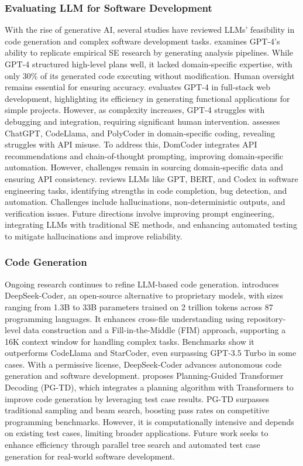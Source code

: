 \subsubsection{Evaluating LLM for Software Development}
With the rise of generative AI, several studies have reviewed LLMs' feasibility in code generation and complex software development tasks.
\citet{liang2024can} examines GPT-4’s ability to replicate empirical SE research by generating analysis pipelines. While GPT-4 structured high-level plans well, it lacked domain-specific expertise, with only 30\% of its generated code executing without modification. Human oversight remains essential for ensuring accuracy. \citet{sandberg2024evaluating} evaluates GPT-4 in full-stack web development, highlighting its efficiency in generating functional applications for simple projects. However, as complexity increases, GPT-4 struggles with debugging and integration, requiring significant human intervention. \citet{gu2023effectiveness} assesses ChatGPT, CodeLlama, and PolyCoder in domain-specific coding, revealing struggles with API misuse. To address this, DomCoder integrates API recommendations and chain-of-thought prompting, improving domain-specific automation. However, challenges remain in sourcing domain-specific data and ensuring API consistency. 
\citet{fan2023large} reviews LLMs like GPT, BERT, and Codex in software engineering tasks, identifying strengths in code completion, bug detection, and automation. Challenges include hallucinations, non-deterministic outputs, and verification issues. Future directions involve improving prompt engineering, integrating LLMs with traditional SE methods, and enhancing automated testing to mitigate hallucinations and improve reliability.

\subsubsection{Code Generation}
Ongoing research continues to refine LLM-based code generation.
\citet{guo2024deepseek} introduces DeepSeek-Coder, an open-source alternative to proprietary models, with sizes ranging from 1.3B to 33B parameters trained on 2 trillion tokens across 87 programming languages. It enhances cross-file understanding using repository-level data construction and a Fill-in-the-Middle (FIM) approach, supporting a 16K context window for handling complex tasks. Benchmarks show it outperforms CodeLlama and StarCoder, even surpassing GPT-3.5 Turbo in some cases. With a permissive license, DeepSeek-Coder advances autonomous code generation and software development.
\citet{zhang2023planning} proposes Planning-Guided Transformer Decoding (PG-TD), which integrates a planning algorithm with Transformers to improve code generation by leveraging test case results. PG-TD surpasses traditional sampling and beam search, boosting pass rates on competitive programming benchmarks. However, it is computationally intensive and depends on existing test cases, limiting broader applications. Future work seeks to enhance efficiency through parallel tree search and automated test case generation for real-world software development.

